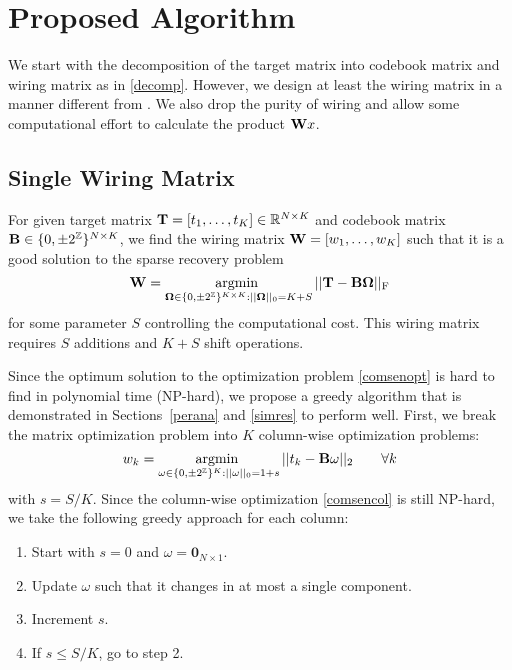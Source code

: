 \documentclass[twocolumn]{IEEEtran}
\begin{document}
\section{Proposed Algorithm}
\label{proalg}

We start with the decomposition of the target matrix into codebook matrix and wiring matrix as in \eqref{decomp}. However, we design at least the wiring matrix in a manner different from \cite{liberty:09}.
We also drop the purity of wiring and allow some computational effort to calculate the product $\mathbf{W} x$.

\subsection{Single Wiring Matrix}
\label{sinwirmat}

For given target matrix $\mathbf{T}=[t_1,\dots,t_K] \in \mathbb{R}^{N\times K}$ and codebook matrix $\mathbf{B}\in \{0, \pm 2^{\mathbb{Z}}\}^{N\times K}$, we find the wiring matrix $\mathbf{W}=[w_1,\dots,w_K]$ such that it is a good solution to the sparse recovery problem
\begin{equation}
\label{comsenopt}
\mathbf{W} = \operatorname*{\mathrm{argmin}\hspace*{1mm}}\limits_{\mathbf{\Omega}\in\{0,\pm 2^{\mathbb{Z}}\}^{K\times K} :||\mathbf{\Omega}||_0=K+S} || \mathbf{T} - \mathbf{B} \mathbf{\Omega} ||_{\text F}
\end{equation}
for some parameter $S$ controlling the computational cost. 
This wiring matrix requires $S$ additions and $K+S$ shift operations.

Since the optimum solution to the optimization problem \eqref{comsenopt} is hard to find in polynomial time (NP-hard), we propose a greedy algorithm that is demonstrated in Sections~\ref{perana} and \ref{simres} to perform well.
First, we break the matrix optimization problem into $K$ column-wise optimization problems:
\begin{equation}
\label{comsencol}
w_k = \operatorname*{\mathrm{argmin}\hspace*{1mm}}\limits_{\omega\in\{0,\pm 2^{\mathbb{Z}}\}^K :||\omega||_0=1+s} || t_k - \mathbf{B} \omega ||_2 \qquad \forall k
\end{equation}
with $s=S/K$.
Since the column-wise optimization \eqref{comsencol} is still NP-hard, we take the following greedy approach for each column:
\begin{enumerate}
\item
Start with $s=0$ and $\omega=\mathbf 0_{N\times 1}$.
\item
Update $\omega$ such that it changes in at most a single component. 
\item
Increment $s$.
\item
If $s\le S/K$, go to step 2.
\end{enumerate}
\end{document}
